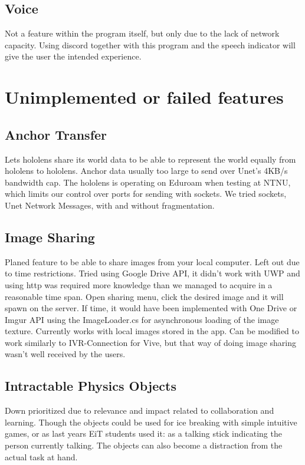         \subsection{Voice}
        Not a feature within the program itself, but only due to the lack of network capacity. Using discord together with this program and the speech indicator will give the user the intended experience. %
        
    \section{Unimplemented or failed features} %
        
        \subsection{Anchor Transfer}
        Lets hololens share its world data to be able to represent the world equally from hololens to hololens. Anchor data usually too large to send over Unet's 4KB/s bandwidth cap. The hololens is operating on Eduroam when testing at NTNU, which limits our control over ports for sending with sockets. We tried sockets, Unet Network Messages, with and without fragmentation. %
        
        \subsection{Image Sharing}
        Planed feature to be able to share images from your local computer. Left out due to time restrictions. Tried using Google Drive API, it didn't work with UWP and using http was required more knowledge than we managed to acquire in a reasonable time span. Open sharing menu, click the desired image and it will spawn on the server. If time, it would have been implemented with One Drive or Imgur API using the ImageLoader.cs for asynchronous loading of the image texture. Currently works with local images stored in the app. Can be modified to work similarly to IVR-Connection for Vive, but that way of doing image sharing wasn't well received by the users. %
        
        \subsection{Intractable Physics Objects} %
        Down prioritized due to relevance and impact related to collaboration and learning. Though the objects could be used for ice breaking with simple intuitive games, or as last years EiT students used it: as a talking stick indicating the person currently talking. The objects can also become a distraction from the actual task at hand. %
        
